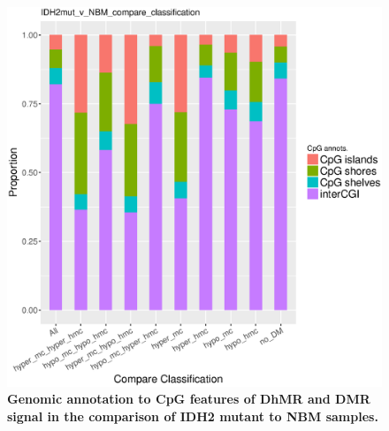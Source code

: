 \begin{figure}[ht!]
\centering
\includegraphics[width=1\textwidth]{chap5figs/figure5_15.eps}
\caption[Genomic annotation to CpG features of DhMR and DMR signal in the comparison of IDH2 mutant to NBM samples.]
{
\textbf{Genomic annotation to CpG features of DhMR and DMR signal in the comparison of IDH2 mutant to NBM samples.}
}
\label{chap5:fig:15}
\end{figure}

\newpage

